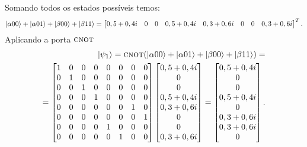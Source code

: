 Somando todos os estados possíveis temos:
\begin{equation}
  \ket{\alpha 00}+\ket{\alpha 01}+\ket{\beta 00}+\ket{\beta 11} =
  \begin{bmatrix} {0,5+0,4i} & 0 & 0 & {0,5+0,4i} & {0,3+0,6i} & 0 & 0 & {0,3+0,6i} \end{bmatrix}^T.
\end{equation}
Aplicando a porta \(\operatorname{\textsc{cnot}}\)
\begin{equation}
  \begin{split}
    \ket{\psi_1} = \operatorname{\textsc{cnot}} (\ket{\alpha 00}+\ket{\alpha 01}+\ket{\beta 00}+\ket{\beta 11}) = \\
   = \begin{bmatrix}
    1 & 0 & 0 & 0 & 0 & 0 & 0 & 0 \\
    0 & 1 & 0 & 0 & 0 & 0 & 0 & 0 \\
    0 & 0 & 1 & 0 & 0 & 0 & 0 & 0 \\
    0 & 0 & 0 & 1 & 0 & 0 & 0 & 0 \\
    0 & 0 & 0 & 0 & 0 & 0 & 1 & 0 \\
    0 & 0 & 0 & 0 & 0 & 0 & 0 & 1 \\
    0 & 0 & 0 & 0 & 1 & 0 & 0 & 0 \\
    0 & 0 & 0 & 0 & 0 & 1 & 0 & 0
    \end{bmatrix}
    \begin{bmatrix} {0,5+0,4i} \\ 0 \\ 0 \\ {0,5+0,4i} \\ {0,3+0,6i} \\ 0 \\ 0 \\ {0,3+0,6i} \end{bmatrix} =
    \begin{bmatrix} {0,5+0,4i} \\ 0 \\ 0 \\ {0,5+0,4i} \\ 0 \\ {0,3+0,6i} \\ {0,3+0,6i} \\ 0 \end{bmatrix}.
  \end{split}
\end{equation}

